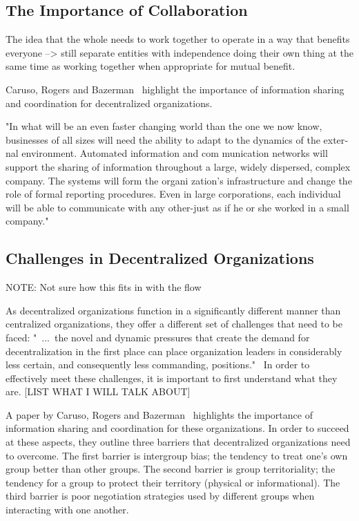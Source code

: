 \subsection{The Importance of Collaboration}
The idea that the whole needs to work together to operate in a way that benefits everyone --> still separate entities with independence doing their own thing at the same time as working together when appropriate for mutual benefit.

Caruso, Rogers and Bazerman~\cite{caruso2008boundaries} highlight the importance of information sharing and coordination for decentralized organizations. 

"In what will be an even faster changing world than the one we now  know,  businesses of all sizes  will need the ability to adapt to the dynamics of the exter­ nal environment. Automated information and com­ munication networks will  support the sharing of information throughout a large, widely  dispersed, complex company. The systems will form the organi­ zation's infrastructure and change the role of formal reporting procedures. Even in large  corporations, each  individual will  be able to communicate with any  other-just as if he or she  worked in  a small company."\cite{applegate1988}

\subsection{Challenges in Decentralized Organizations}

NOTE: Not sure how this fits in with the flow

As decentralized organizations function in a significantly different manner than centralized organizations, they offer a different set of challenges that need to be faced: "~...~the novel and dynamic pressures that create the demand for decentralization in the first place can place organization leaders in considerably less certain, and consequently less commanding, positions."~\cite{caruso2008boundaries} In order to effectively meet these challenges, it is important to first understand what they are. [LIST WHAT I WILL TALK ABOUT]

A paper by Caruso, Rogers and Bazerman~\cite{caruso2008boundaries} highlights the importance of information sharing and coordination for these organizations. In order to succeed at these aspects, they outline three barriers that decentralized organizations need to overcome. The first barrier is intergroup bias; the tendency to treat one's own group better than other groups. The second barrier is group territoriality; the tendency for a group to protect their territory (physical or informational). The third barrier is poor negotiation strategies used by different groups when interacting with one another. 

